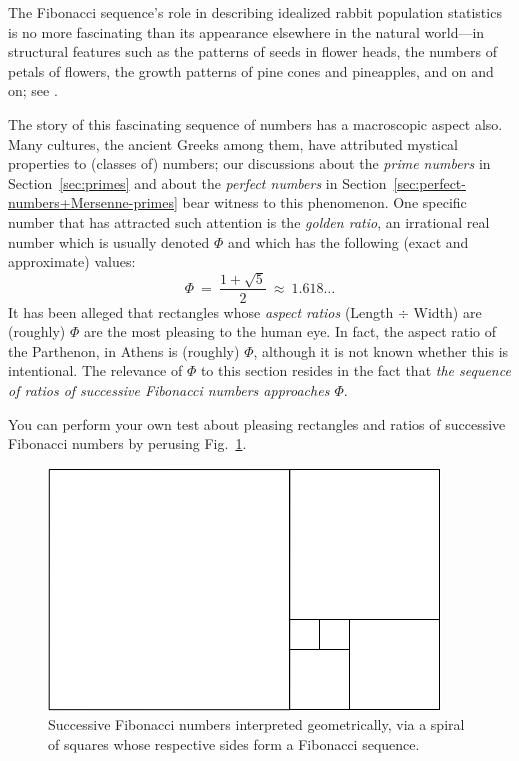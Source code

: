 The Fibonacci sequence's role in describing idealized rabbit
population statistics is no more fascinating than its appearance
elsewhere in the natural world---in structural features such as the
patterns of seeds in flower heads, the numbers of petals of flowers,
the growth patterns of pine cones and pineapples, and on and on; see
\cite{Basin63}.

The story of this fascinating sequence of numbers has a macroscopic
aspect also.  Many cultures, the ancient Greeks among them, have
attributed mystical properties to (classes of) numbers; our
discussions about the {\it prime numbers} in Section~\ref{sec:primes}
and about the {\it perfect numbers} in
Section~\ref{sec:perfect-numbers+Mersenne-primes} bear witness to this
phenomenon.  One specific number that has attracted such attention is
the {\it golden ratio}, an irrational real number which is usually
denoted $\Phi$ and which has the following (exact and approximate)
values:  
\[ \Phi \ = \ \frac{1+\sqrt{5}}{2} \ \approx \  1.618\ldots \]
It has been alleged that rectangles whose {\it aspect ratios} (Length
$\div$ Width) are (roughly) $\Phi$ are the most pleasing to the human
eye.  In fact, the aspect ratio of the Parthenon, in Athens is
(roughly) $\Phi$, although it is not known whether this is
intentional.  The relevance of $\Phi$ to this section resides in the
fact that {\em the sequence of ratios of successive Fibonacci numbers
approaches $\Phi$}.

You can perform your own test about pleasing rectangles and ratios of
successive Fibonacci numbers by perusing Fig.~\ref{fig:fibosquare}.
\begin{figure}[htb]
\begin{center}
        \includegraphics[scale=0.5]{FiguresMaths//Fiboembedded}
\caption{Successive Fibonacci numbers interpreted geometrically, via a
  spiral of squares whose respective sides form a Fibonacci
  sequence.}
        \label{fig:fibosquare}
\end{center}
\end{figure}

